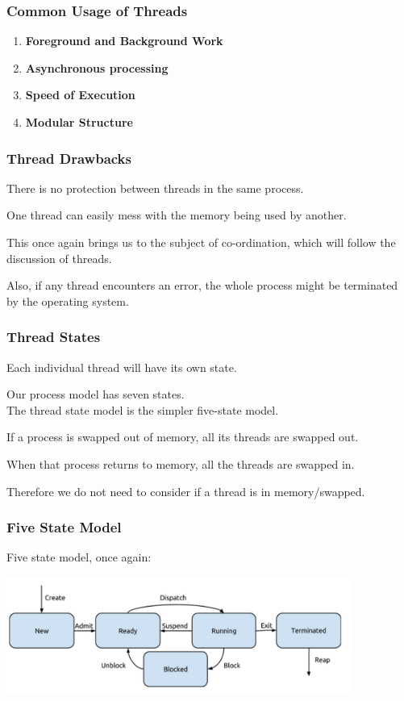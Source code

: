 \begin{frame}
	\frametitle{Common Usage of Threads}

	\begin{enumerate}
		\item \textbf{Foreground and Background Work}
		\item \textbf{Asynchronous processing}
		\item \textbf{Speed of Execution}
		\item \textbf{Modular Structure}
	\end{enumerate}

\end{frame}

\begin{frame}
	\frametitle{Thread Drawbacks}

	There is no protection between threads in the same process.

	One thread can easily mess with the memory being used by another.

	This once again brings us to the subject of co-ordination, which will follow the discussion of threads.

	Also, if any thread encounters an error, the whole process might be terminated by the operating system.

\end{frame}

\begin{frame}
	\frametitle{Thread States}
	Each individual thread will have its own state.

	Our process model has seven states.\\
	\quad The thread state model is the simpler five-state model.

	If a process is swapped out of memory, all its threads are swapped out.

	When that process returns to memory, all the threads are swapped in.

	Therefore we do not need to consider if a thread is in memory/swapped.

\end{frame}

\begin{frame}
	\frametitle{Five State Model}
	Five state model, once again:

	\begin{center}
		\includegraphics[width=0.85\textwidth]{images/5-state-model.png}
	\end{center}

\end{frame}

